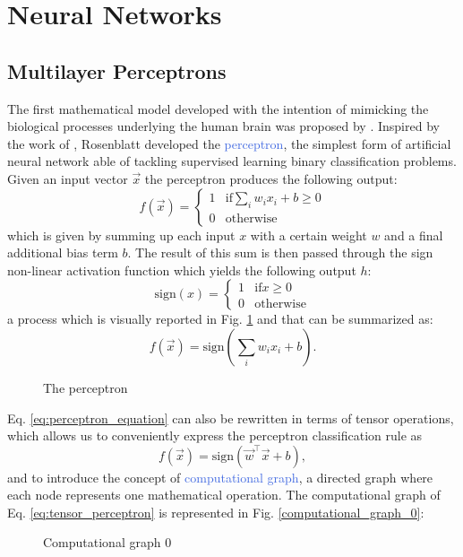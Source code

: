 \section{Neural Networks}
\label{sec:neural_networks}

\subsection{Multilayer Perceptrons}
\label{sec:general_architecture}
The first mathematical model developed with the intention of mimicking the biological processes underlying the human brain was proposed by \citet{}. Inspired by the work of \citet{}, Rosenblatt developed the \textcolor{RoyalBlue}{perceptron}, the simplest form of artificial neural network able of tackling supervised learning binary classification problems. Given an input vector $\vec{x}$ the perceptron produces the following output:
\begin{equation}
	f(\vec{x}) = 
		\begin{cases}
			1  & \text{if} \sum_i w_i x_i + b \geq 0 \\
			0 & \text{otherwise}
		\end{cases}
\end{equation}
which is given by summing up each input $x$ with a certain weight $w$ and a final additional bias term $b$. The result of this sum is then passed through the sign non-linear activation function which yields the following output $h$:
\begin{equation}
	\text{sign}(x) = 
		\begin{cases}
			1  & \text{if} x \geq 0 \\
			0 & \text{otherwise}
		\end{cases}
\end{equation}
a process which is visually reported in Fig. \ref{fig:perceptron} and that can be summarized as:
\begin{equation}
	f(\vec{x}) = \text{sign}(\sum_i w_i x_i + b).
	\label{eq:perceptron_equation}
\end{equation}

\begin{figure}[ht!]
	\centering
	
\caption{The perceptron}
\label{fig:perceptron}
\end{figure}

Eq. \ref{eq:perceptron_equation} can also be rewritten in terms of tensor operations, which allows us to conveniently express the perceptron classification rule as 
\begin{equation}
	f(\vec{x}) = \text{sign}(\vec{w}^\intercal \vec{x} + b),
	\label{eq:tensor_perceptron}
\end{equation}
and to introduce the concept of \textcolor{RoyalBlue}{computational graph}, a directed graph where each node represents one mathematical operation. The computational graph of Eq. \ref{eq:tensor_perceptron} is represented in Fig. \ref{computational_graph_0}:
\begin{figure}[ht!]
	\centering
	
\caption{Computational graph 0}
\label{fig:computational_graph_0}
\end{figure}

